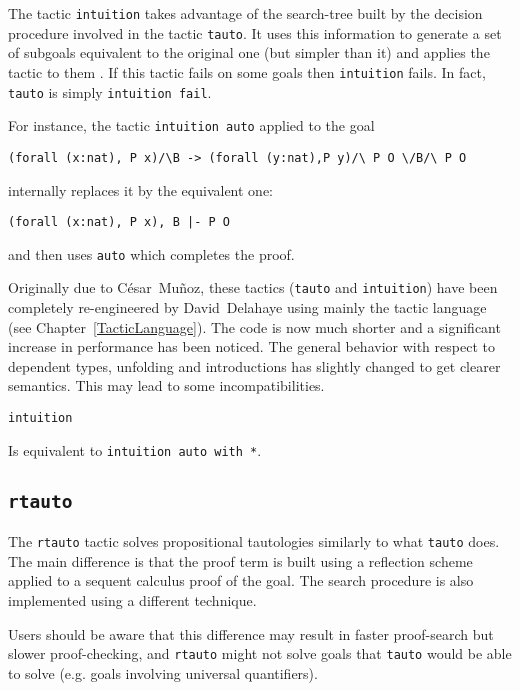 \begin{coq_example*}
The tactic \texttt{intuition} takes advantage of the search-tree built
by the decision procedure involved in the tactic {\tt tauto}. It uses
this information to generate a set of subgoals equivalent to the
original one (but simpler than it) and applies the tactic
{\tac} to them \cite{Mun94}. If this tactic fails on some goals then
{\tt intuition} fails. In fact, {\tt tauto} is simply {\tt intuition
  fail}.

For instance, the tactic {\tt intuition auto} applied to the goal
\begin{verbatim}
(forall (x:nat), P x)/\B -> (forall (y:nat),P y)/\ P O \/B/\ P O
\end{verbatim}
internally replaces it by the equivalent one:
\begin{verbatim}
(forall (x:nat), P x), B |- P O
\end{verbatim}
and then uses {\tt auto} which completes the proof.

Originally due to C{\'e}sar~Mu{\~n}oz, these tactics ({\tt tauto} and {\tt intuition})
have been completely re-engineered by David~Delahaye using mainly the tactic
language (see Chapter~\ref{TacticLanguage}). The code is now much shorter and
a significant increase in performance has been noticed. The general behavior
with respect to dependent types, unfolding and introductions has
slightly changed to get clearer semantics. This may lead to some
incompatibilities.

\begin{Variants}
\item {\tt intuition}

  Is equivalent to {\tt intuition auto with *}.
\end{Variants}



\subsection{\tt rtauto}
\label{rtauto}

The {\tt rtauto} tactic solves propositional tautologies similarly to what {\tt tauto} does. The main difference is that the proof term is built using a reflection scheme applied to a sequent calculus proof of the goal. The search procedure is also implemented using a different technique.

Users should be aware that this difference may result in faster proof-search but  slower proof-checking, and {\tt rtauto} might not solve goals that {\tt tauto} would be able to solve (e.g. goals involving universal quantifiers).


\end{coq_example*}
